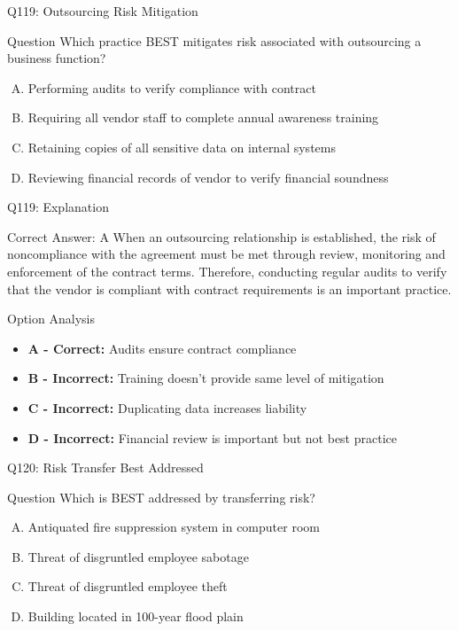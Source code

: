 \documentclass{beamer}
\begin{document}
	\begin{frame}{Q119: Outsourcing Risk Mitigation}
		\begin{block}{Question}
			Which practice BEST mitigates risk associated with outsourcing a business function?
		\end{block}
		\begin{enumerate}[(A)]
			\item Performing audits to verify compliance with contract
			\item Requiring all vendor staff to complete annual awareness training
			\item Retaining copies of all sensitive data on internal systems
			\item Reviewing financial records of vendor to verify financial soundness
		\end{enumerate}
	\end{frame}
	
	\begin{frame}{Q119: Explanation}
		\begin{block}{Correct Answer: A}
			When an outsourcing relationship is established, the risk of noncompliance with the agreement must be met through review, monitoring and enforcement of the contract terms. Therefore, conducting regular audits to verify that the vendor is compliant with contract requirements is an important practice.
		\end{block}
		\begin{block}{Option Analysis}
			\begin{itemize}
				\item \textbf{A - Correct:} Audits ensure contract compliance
				\item \textbf{B - Incorrect:} Training doesn't provide same level of mitigation
				\item \textbf{C - Incorrect:} Duplicating data increases liability
				\item \textbf{D - Incorrect:} Financial review is important but not best practice
			\end{itemize}
		\end{block}
	\end{frame}
	
	\begin{frame}{Q120: Risk Transfer Best Addressed}
		\begin{block}{Question}
			Which is BEST addressed by transferring risk?
		\end{block}
		\begin{enumerate}[(A)]
			\item Antiquated fire suppression system in computer room
			\item Threat of disgruntled employee sabotage
			\item Threat of disgruntled employee theft
			\item Building located in 100-year flood plain
		\end{enumerate}
	\end{frame}
	
\end{document}

